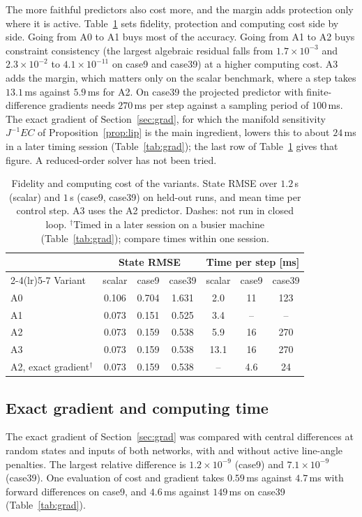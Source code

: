 \documentclass[preprint,12pt]{elsarticle}
\begin{document}
The more faithful predictors also cost more, and the margin adds protection only where it is active. Table~\ref{tab:tradeoff} sets fidelity, protection and computing cost side by side. Going from A0 to A1 buys most of the accuracy. Going from A1 to A2 buys constraint consistency (the largest algebraic residual falls from $1.7\times10^{-3}$ and $2.3\times10^{-2}$ to $4.1\times10^{-11}$ on case9 and case39) at a higher computing cost. A3 adds the margin, which matters only on the scalar benchmark, where a step takes $13.1$\,ms against $5.9$\,ms for A2. On case39 the projected predictor with finite-difference gradients needs $270$\,ms per step against a sampling period of $100$\,ms. The exact gradient of Section~\ref{sec:grad}, for which the manifold sensitivity $J^{-1}EC$ of Proposition~\ref{prop:lip} is the main ingredient, lowers this to about $24$\,ms in a later timing session (Table~\ref{tab:grad}); the last row of Table~\ref{tab:tradeoff} gives that figure. A reduced-order solver has not been tried.

\begin{table}[!t]\centering\small
\setlength{\tabcolsep}{5pt}
\caption{Fidelity and computing cost of the variants. State RMSE over $1.2$\,s (scalar) and $1$\,s (case9, case39) on held-out runs, and mean time per control step. A3 uses the A2 predictor. Dashes: not run in closed loop. $^{\dagger}$Timed in a later session on a busier machine (Table~\ref{tab:grad}); compare times within one session.}
\label{tab:tradeoff}
\begin{tabular}{lcccccc}
\toprule
 & \multicolumn{3}{c}{State RMSE} & \multicolumn{3}{c}{Time per step [ms]}\\
\cmidrule(lr){2-4}\cmidrule(lr){5-7}
Variant & scalar & case9 & case39 & scalar & case9 & case39\\
\midrule
A0 & 0.106 & 0.704 & 1.631 & 2.0 & 11 & 123\\
A1 & 0.073 & 0.151 & 0.525 & 3.4 & -- & --\\
A2 & 0.073 & 0.159 & 0.538 & 5.9 & 16 & 270\\
A3 & 0.073 & 0.159 & 0.538 & 13.1 & 16 & 270\\
A2, exact gradient$^{\dagger}$ & 0.073 & 0.159 & 0.538 & -- & 4.6 & 24\\
\bottomrule
\end{tabular}
\end{table}

\subsection{Exact gradient and computing time}
\label{sec:grad_results}
The exact gradient of Section~\ref{sec:grad} was compared with central differences at random states and inputs of both networks, with and without active line-angle penalties. The largest relative difference is $1.2\times10^{-9}$ (case9) and $7.1\times10^{-9}$ (case39). One evaluation of cost and gradient takes $0.59$\,ms against $4.7$\,ms with forward differences on case9, and $4.6$\,ms against $149$\,ms on case39 (Table~\ref{tab:grad}).
\end{document}
